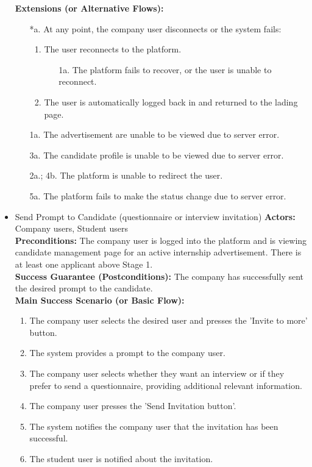 \begin{itemize}[label={[\textbf{UC}]}, align=left, leftmargin=*]
    \textbf{Extensions (or Alternative Flows):} 
    \begin{enumerate}[label=\arabic*.]
        \item[*a.] At any point, the company user disconnects or the system fails:
            \begin{enumerate}[label=\arabic*.]
                \item The user reconnects to the platform.
                    \begin{enumerate}[label=\alph*.]
                        \item[1a.] The platform fails to recover, or the user is unable to reconnect.
                    \end{enumerate}
                 \item The user is automatically logged back in and returned to the lading page.
            \end{enumerate}
        \item[1a.] The advertisement are unable to be viewed due to server error. 
        \item[3a.] The candidate profile is unable to be viewed due to server error. 
        \item[2a.; 4b.] The platform is unable to redirect the user.
        \item[5a.] The platform fails to make the status change due to server error.
        \end{enumerate}


    \item {} Send Prompt to Candidate (questionnaire or interview invitation)
    \textbf{Actors:} Company users, Student users\\
     \textbf{Preconditions:} The company user is logged into the platform and is viewing candidate management page for an active internship advertisement. There is at least one applicant above Stage 1.\\
     \textbf{Success Guarantee (Postconditions):} The company has successfully sent the desired prompt to the candidate. \\
     \textbf{Main Success Scenario (or Basic Flow):} 
     \begin{enumerate}[label=\arabic*.] 
        \item The company user selects the desired user and presses the 'Invite to more' button.
        \item The system provides a prompt to the company user.
        \item The company user selects whether they want an interview or if they prefer to send a questionnaire, providing additional relevant information.
        \item The company user presses the 'Send Invitation button'.
        \item The system notifies the company user that the invitation has been successful.
        \item The student user is notified about the invitation.
     \end{enumerate} \\


\end{itemize}
